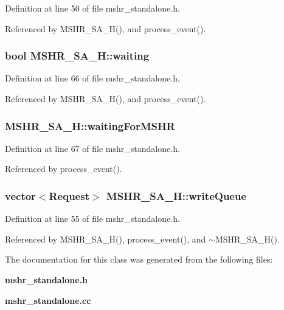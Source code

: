 Definition at line 50 of file mshr\_\-standalone.h.

Referenced by MSHR\_\-SA\_\-H(), and process\_\-event().
\subsubsection[{waiting}]{\setlength{\rightskip}{0pt plus 5cm}bool {\bf MSHR\_\-SA\_\-H::waiting}}\label{classMSHR__SA__H_bc29d3736d9cb17fa5497be38be49625}




Definition at line 66 of file mshr\_\-standalone.h.

Referenced by MSHR\_\-SA\_\-H(), and process\_\-event().
\subsubsection[{waitingForMSHR}]{ {\bf MSHR\_\-SA\_\-H::waitingForMSHR}}\label{classMSHR__SA__H_6a54d36bf4148ab5e0a38382ab1027b9}




Definition at line 67 of file mshr\_\-standalone.h.

Referenced by process\_\-event().
\subsubsection[{writeQueue}]{\setlength{\rightskip}{0pt plus 5cm}vector$<${\bf Request}$>$ {\bf MSHR\_\-SA\_\-H::writeQueue}}\label{classMSHR__SA__H_6cc5861bf1966cfd1026b358cfaa08ce}




Definition at line 55 of file mshr\_\-standalone.h.

Referenced by MSHR\_\-SA\_\-H(), process\_\-event(), and $\sim$MSHR\_\-SA\_\-H().

The documentation for this class was generated from the following files:\begin{CompactItemize}
\item 
{\bf mshr\_\-standalone.h}\item 
{\bf mshr\_\-standalone.cc}\end{CompactItemize}
